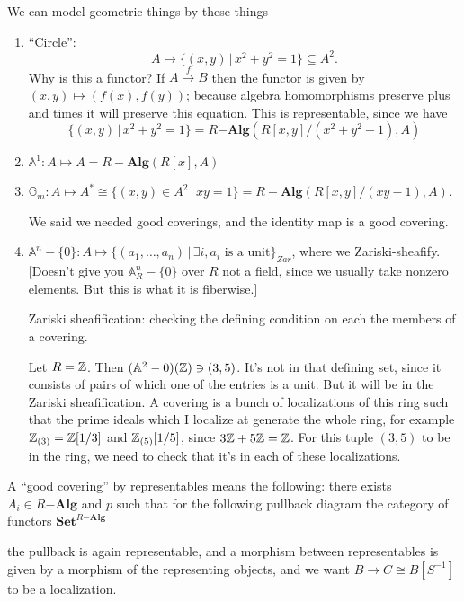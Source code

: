 \documentclass[../MH_Total.tex]{subfiles}
\begin{document}
\begin{example}
	We can model geometric things by these things

	\begin{enumerate}
		\item ``Circle'':
	\[
	A \mapsto \{(x,y) \,|\, x^2 + y^2 = 1\} \subseteq A^2.
	\]
	Why is this a functor? If $A \xrightarrow{f} B$ then the functor is given by $(x,y) \mapsto (f(x),f(y))$; because algebra homomorphisms preserve plus and times it will preserve this equation. This is representable, since we have
	\[
	\{(x,y) \,|\, x^2 + y^2 = 1\} = R\mathbf{-Alg}(R[x,y]/(x^2 + y^2 - 1),A)
	\]

		\item $\mathbb{A}^1: A \mapsto A = R-\mathbf{Alg}(R[x],A)$
		\item $\mathbb{G}_m: A \mapsto A^* \cong \{(x,y) \in A^2 \,|\, xy = 1\} = R-\mathbf{Alg}(R[x,y]/(xy - 1),A)$.

		We said we needed good coverings, and the identity map is a good covering. 

	\item $\mathbb{A}^n - \{0\}: A \mapsto \{(a_1,\dots,a_n) \,|\, \exists i, a_i \text{ is a unit}\}_{Zar}$, where we Zariski-sheafify. [Doesn't give you $\mathbb{A}^n_R - \{0\}$ over $R$ not a field, since we usually take nonzero elements. But this is what it is fiberwise.]

	Zariski sheafification: checking the defining condition on each the members of a covering.

	\begin{example}
		Let $R = \mathbb{Z}$. Then $(\mathbb{A}^2 - 0)(\mathbb{Z}) \ni (3,5)$. It's not in that defining set, since it consists of pairs of which one of the entries is a unit. But it will be in the Zariski sheafification. A covering is a bunch of localizations of this ring such that the prime ideals which I localize at generate the whole ring, for example $\mathbb{Z}_{(3)} = \mathbb{Z}[1/3]$ and $\mathbb{Z}_{(5)}[1/5]$, since $3\mathbb{Z} + 5\mathbb{Z} = \mathbb{Z}$. For this tuple $(3,5)$ to be in the ring, we need to check that it's in each of these localizations.
	\end{example}
	\end{enumerate}
\end{example}

A ``good covering'' by representables means the following: there exists $A_i \in R\mathbf{-Alg}$ and $p$ such that for the following pullback diagram the category of functors $\mathbf{Set}^{R\mathbf{-Alg}}$
\begin{center}
\end{center}
the pullback is again representable, and a morphism between representables is given by a morphism of the representing objects, and we want $B \to C \cong B[S^{-1}]$ to be a localization.
\end{document}
